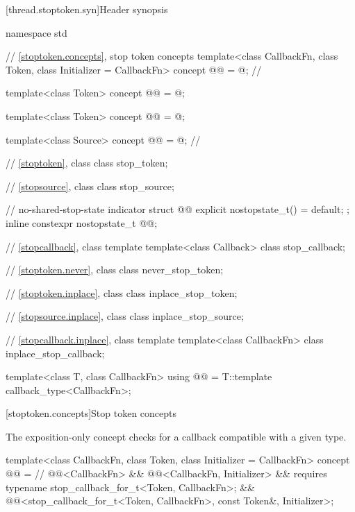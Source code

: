 [thread.stoptoken.syn]{Header  synopsis}

%
\begin{codeblock}
namespace std {
  // \ref{stoptoken.concepts}, stop token concepts
  template<class CallbackFn, class Token, class Initializer = CallbackFn>
    concept @@ = @\seebelow@;           // \expos

  template<class Token>
    concept @@ = @\seebelow@;

  template<class Token>
    concept @@ = @\seebelow@;

  template<class Source>
    concept @@ = @\seebelow@;                 // \expos

  // \ref{stoptoken}, class 
  class stop_token;

  // \ref{stopsource}, class 
  class stop_source;

  // no-shared-stop-state indicator
  struct @@ {
    explicit nostopstate_t() = default;
  };
  inline constexpr nostopstate_t @@{};

  // \ref{stopcallback}, class template 
  template<class Callback>
    class stop_callback;

  // \ref{stoptoken.never}, class 
  class never_stop_token;

  // \ref{stoptoken.inplace}, class 
  class inplace_stop_token;

  // \ref{stopsource.inplace}, class 
  class inplace_stop_source;

  // \ref{stopcallback.inplace}, class template 
  template<class CallbackFn>
    class inplace_stop_callback;

  template<class T, class CallbackFn>
    using @@ = T::template callback_type<CallbackFn>;
}
\end{codeblock}

[stoptoken.concepts]{Stop token concepts}

\pnum
The exposition-only  concept
checks for a callback compatible with a given  type.
\begin{codeblock}
template<class CallbackFn, class Token, class Initializer = CallbackFn>
  concept @@ =                          // \expos
    @@<CallbackFn> &&
    @@<CallbackFn, Initializer> &&
    requires { typename stop_callback_for_t<Token, CallbackFn>; } &&
    @@<stop_callback_for_t<Token, CallbackFn>, const Token&, Initializer>;
\end{codeblock}

